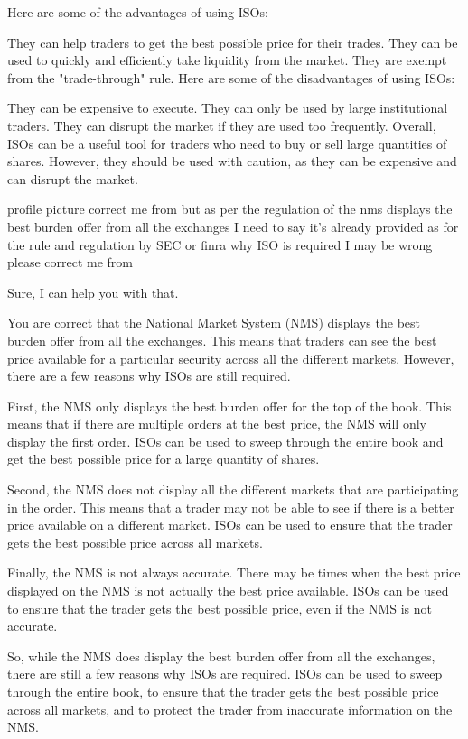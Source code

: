 \documentclass[11pt]{article}
\begin{document}
Here are some of the advantages of using ISOs:

They can help traders to get the best possible price for their trades.
They can be used to quickly and efficiently take liquidity from the market.
They are exempt from the "trade-through" rule.
Here are some of the disadvantages of using ISOs:

They can be expensive to execute.
They can only be used by large institutional traders.
They can disrupt the market if they are used too frequently.
Overall, ISOs can be a useful tool for traders who need to buy or sell large quantities of shares. However, they should be used with caution, as they can be expensive and can disrupt the market.

profile picture
correct me from
but as per the regulation
of the nms
displays
the best burden offer
from all the exchanges
I need to say it's already provided
as for the rule and regulation by SEC or finra
why ISO is required
I may be wrong please correct me from

Sure, I can help you with that.

You are correct that the National Market System (NMS) displays the best burden offer from all the exchanges. This means that traders can see the best price available for a particular security across all the different markets. However, there are a few reasons why ISOs are still required.

First, the NMS only displays the best burden offer for the top of the book. This means that if there are multiple orders at the best price, the NMS will only display the first order. ISOs can be used to sweep through the entire book and get the best possible price for a large quantity of shares.

Second, the NMS does not display all the different markets that are participating in the order. This means that a trader may not be able to see if there is a better price available on a different market. ISOs can be used to ensure that the trader gets the best possible price across all markets.

Finally, the NMS is not always accurate. There may be times when the best price displayed on the NMS is not actually the best price available. ISOs can be used to ensure that the trader gets the best possible price, even if the NMS is not accurate.

So, while the NMS does display the best burden offer from all the exchanges, there are still a few reasons why ISOs are required. ISOs can be used to sweep through the entire book, to ensure that the trader gets the best possible price across all markets, and to protect the trader from inaccurate information on the NMS.
\end{document}
